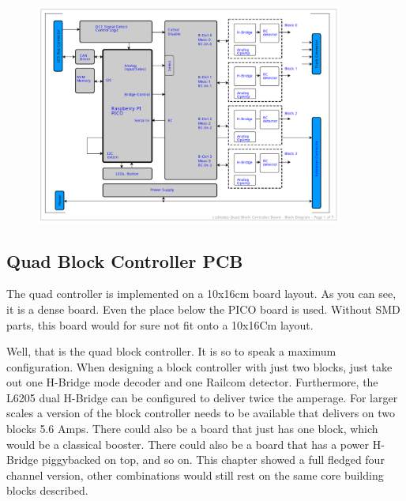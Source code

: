 \begin{figure}[htbp]
    \centering
    \includegraphics[page=7, width=0.9\textwidth]{./Schematics/Schematic_LcsNodes-Quad-Block-Controller.pdf}
\end{figure}
\FloatBarrier

\subsection{Quad Block Controller PCB}

The quad controller is implemented on a 10x16cm board layout. As you can see, it is a dense board. Even the place below the PICO board is used. Without SMD parts, this board would for sure not fit onto a 10x16Cm layout.



Well, that is the quad block controller. It is so to speak a maximum configuration. When designing a block controller with just two blocks, just take out one H-Bridge mode decoder and one Railcom detector. Furthermore, the L6205 dual H-Bridge can be configured to deliver twice the amperage. For larger scales a version of the block controller needs to be available that delivers on two blocks 5.6 Amps. There could also be a board that just has one block, which would be a classical booster. There could also be a board that has a power H-Bridge piggybacked on top, and so on. This chapter showed a full fledged four channel version, other combinations would still rest on the same core building blocks described.


